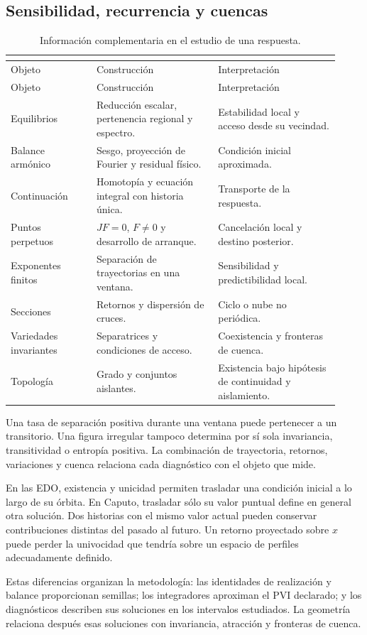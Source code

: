 \subsection{Sensibilidad, recurrencia y cuencas}
\label{sec:lecturas-por-procedimiento}

\begin{longtable}{@{}L{0.24\linewidth}L{0.34\linewidth}L{0.34\linewidth}@{}}
\caption{Información complementaria en el estudio de una respuesta.}
\label{tab:lectura-procedimientos}
\label{tab:drive-complementarios}
\label{tab:drive-isbn-cerrado}\\
\toprule
Objeto & Construcción & Interpretación\\
\midrule
\endfirsthead
\toprule
Objeto & Construcción & Interpretación\\
\midrule
\endhead
Equilibrios & Reducción escalar, pertenencia regional y espectro. & Estabilidad local y acceso desde su vecindad.\\
Balance armónico & Sesgo, proyección de Fourier y residual físico. & Condición inicial aproximada.\\
Continuación & Homotopía y ecuación integral con historia única. & Transporte de la respuesta.\\
Puntos perpetuos & $JF=0$, $F\ne0$ y desarrollo de arranque. & Cancelación local y destino posterior.\\
Exponentes finitos & Separación de trayectorias en una ventana. & Sensibilidad y predictibilidad local.\\
Secciones & Retornos y dispersión de cruces. & Ciclo o nube no periódica.\\
Variedades invariantes & Separatrices y condiciones de acceso. & Coexistencia y fronteras de cuenca.\\
Topología & Grado y conjuntos aislantes. & Existencia bajo hipótesis de continuidad y aislamiento.\\
\bottomrule
\end{longtable}

Una tasa de separación positiva durante una ventana puede pertenecer a un
transitorio. Una figura irregular tampoco determina por sí sola invariancia,
transitividad o entropía positiva. La combinación de trayectoria, retornos,
variaciones y cuenca relaciona cada diagnóstico con el objeto que mide.

En las EDO, existencia y unicidad permiten trasladar una condición inicial
a lo largo de su órbita. En Caputo, trasladar sólo su valor puntual define
en general otra solución. Dos historias con el mismo valor actual pueden
conservar contribuciones distintas del pasado al futuro. Un retorno
proyectado sobre $x$ puede perder la univocidad que tendría sobre un espacio
de perfiles adecuadamente definido.

Estas diferencias organizan la metodología: las identidades de realización
y balance proporcionan semillas; los integradores aproximan el PVI declarado;
y los diagnósticos describen sus soluciones en los intervalos estudiados.
La geometría relaciona después esas soluciones con invariancia, atracción
y fronteras de cuenca.
